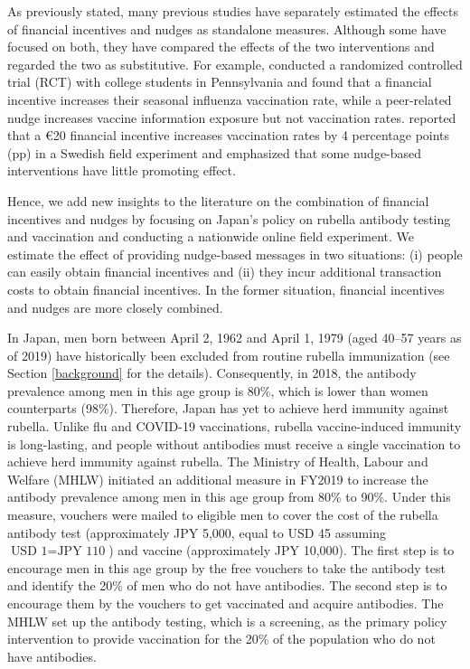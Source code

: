 \documentclass[
      12pt,
    a4paper
]{article}
\begin{document}
As previously stated, many previous studies have separately estimated the effects of financial incentives \citep{Banerjee2010, Barber2022, Barham2009, Brehm2022} and nudges \citep{Dai2021, Chapman2010, Milkman2021, Sasaki2022} as standalone measures. Although some have focused on both, they have compared the effects of the two interventions and regarded the two as substitutive. For example, \citet{Bronchetti2015} conducted a randomized controlled trial (RCT) with college students in Pennsylvania and found that a financial incentive increases their seasonal influenza vaccination rate, while a peer-related nudge increases vaccine information exposure but not vaccination rates. \citet{Campos-Mercade2021a} reported that a €20 financial incentive increases vaccination rates by 4 percentage points (pp) in a Swedish field experiment and emphasized that some nudge-based interventions have little promoting effect.

Hence, we add new insights to the literature on the combination of financial incentives and nudges by focusing on Japan's policy on rubella antibody testing and vaccination and conducting a nationwide online field experiment. We estimate the effect of providing nudge-based messages in two situations: (i) people can easily obtain financial incentives and (ii) they incur additional transaction costs to obtain financial incentives. In the former situation, financial incentives and nudges are more closely combined.

In Japan, men born between April 2, 1962 and April 1, 1979 (aged 40--57 years as of 2019) have historically been excluded from routine rubella immunization (see Section \ref{background} for the details). Consequently, in 2018, the antibody prevalence among men in this age group is 80\%, which is lower than women counterparts (98\%). Therefore, Japan has yet to achieve herd immunity against rubella. Unlike flu and COVID-19 vaccinations, rubella vaccine-induced immunity is long-lasting, and people without antibodies must receive a single vaccination to achieve herd immunity against rubella. The Ministry of Health, Labour and Welfare (MHLW) initiated an additional measure in FY2019 to increase the antibody prevalence among men in this age group from 80\% to 90\%. Under this measure, vouchers were mailed to eligible men to cover the cost of the rubella antibody test (approximately JPY 5,000, equal to USD 45 assuming \(\text{USD 1} = \text{JPY 110}\)) and vaccine (approximately JPY 10,000). The first step is to encourage men in this age group by the free vouchers to take the antibody test and identify the 20\% of men who do not have antibodies. The second step is to encourage them by the vouchers to get vaccinated and acquire antibodies. The MHLW set up the antibody testing, which is a screening, as the primary policy intervention to provide vaccination for the 20\% of the population who do not have antibodies.
\end{document}
